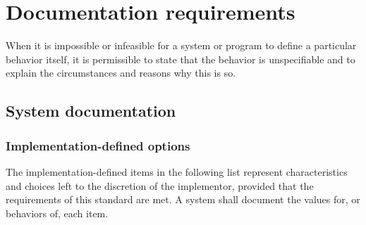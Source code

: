 
\chapter{Documentation requirements}
\label{doc}

When it is impossible or infeasible for a system or program to
define a particular behavior itself, it is permissible to state
that the behavior is unspecifiable and to explain the circumstances
and reasons why this is so.

\section{System documentation} %
\label{doc:system}

\subsection{Implementation-defined options} %

The implementation-defined items in the following list represent
characteristics and choices left to the discretion of the
implementor, provided that the requirements of this standard are
met. A system shall document the values for, or behaviors of, each
item.

